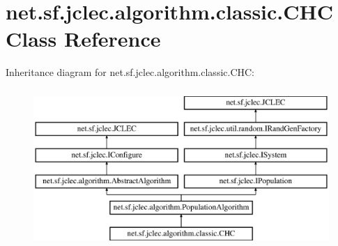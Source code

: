 \hypertarget{classnet_1_1sf_1_1jclec_1_1algorithm_1_1classic_1_1_c_h_c}{\section{net.\-sf.\-jclec.\-algorithm.\-classic.\-C\-H\-C Class Reference}
\label{classnet_1_1sf_1_1jclec_1_1algorithm_1_1classic_1_1_c_h_c}
}
Inheritance diagram for net.\-sf.\-jclec.\-algorithm.\-classic.\-C\-H\-C\-:\begin{figure}[H]
\begin{center}
\leavevmode
\includegraphics[height=6.000000cm]{classnet_1_1sf_1_1jclec_1_1algorithm_1_1classic_1_1_c_h_c}
\end{center}
\end{figure}
